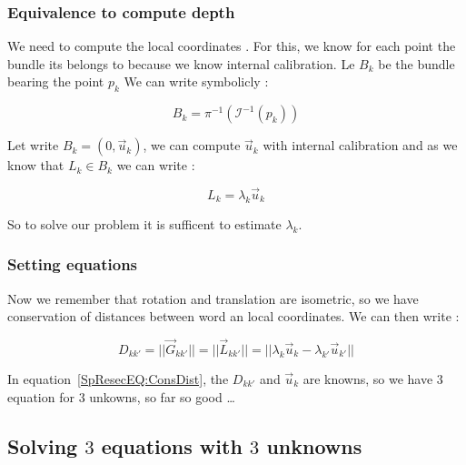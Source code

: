 \subsubsection{Equivalence to compute depth}

We need to compute the local coordinates . For this, we know for each point the bundle its belongs
to because we know internal calibration. Le $B_k$ be the bundle bearing the point $p_k$ We can write symbolicly :


\begin{equation}
	B_k =  \pi^{-1} (\mathcal I ^{-1} (p_k)) \label{SpResecEQ:DefBundle}
\end{equation}



Let write $B_k = (0,\Vec{u}_k)$,  we can compute $\Vec{u}_k$ with internal calibration and
as we know that $L_k \in B_k$ we can write  :


\begin{equation}
	L_k = \lambda_k \Vec{u}_k \label{SpResecEQ:DefLambda}
\end{equation}

So to solve our problem it is sufficent to estimate $\lambda_k$.

\subsubsection{Setting equations}

Now we remember that rotation and translation are isometric, so we have conservation of
distances between  word an local coordinates. We can then write :

\begin{equation}
  D_{kk'}=||\Vec{G}_{kk'}||   = || \Vec{L}_{kk'} || = || \lambda_k \Vec{u}_k -  \lambda_{k'} \Vec{u}_{k'}|| \label{SpResecEQ:ConsDist}
\end{equation}


In equation~\ref{SpResecEQ:ConsDist}, the $D_{kk'}$ and  $\Vec{u}_k$ are knowns, so we have $3$ equation  for
$3$ unkowns, so far so good \dots 




\subsection{Solving $3$  equations with $3$ unknowns}

